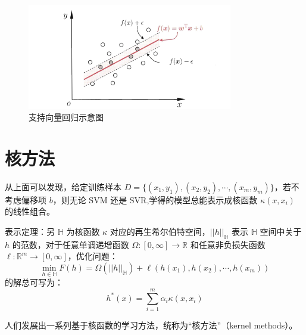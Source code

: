 \documentclass[12pt, a4paper]{article} %
\begin{document}
\begin{figure}[H]
    \centering
    \includegraphics[width=0.8\textwidth]{../img/6-7-支持向量回归示意图.png}
    \caption{支持向量回归示意图}
    \label{fig:支持向量回归示意图}
\end{figure}

\section{核方法}

从上面可以发现，给定训练样本 $D = \{(x_1, y_1), (x_2, y_2), \cdots, (x_m, y_m)\}$，若不考虑偏移项 $b$，则无论 SVM 还是 SVR,学得的模型总能表示成核函数 $\kappa (x, x_i)$ 的线性组合。

\begin{theorem}
    表示定理：另 $\mathbb{H}$ 为核函数 $\kappa$ 对应的再生希尔伯特空间，$||h||_{\mathbb{H}}$ 表示 $\mathbb{H}$ 空间中关于 $h$ 的范数，对于任意单调递增函数 $\Omega: [0, \infty] \to \mathbb{R}$ 和任意非负损失函数 $\ell : \mathbb{R}^m \to [0, \infty]$，优化问题：
    \begin{equation*}
        \min_{h \in \mathbb{H}} F(h) = \Omega (||h||_{\mathbb{H}}) + \ell (h(x_1), h(x_2), \cdots, h(x_m))
    \end{equation*}
    的解总可写为：
    \begin{equation*}
        h^* (x) = \sum_{i = 1}^{m} \alpha_i \kappa(x, x_i)
    \end{equation*}
\end{theorem}

人们发展出一系列基于核函数的学习方法，统称为“核方法”（kernel methods）。
\end{document}
